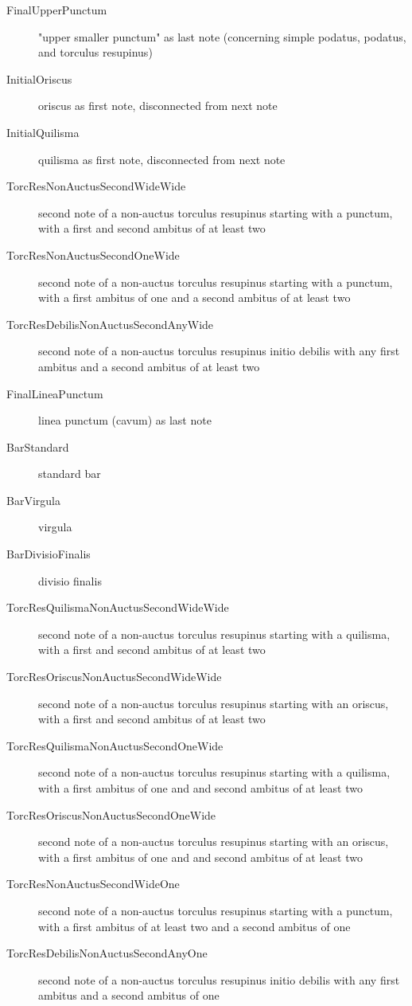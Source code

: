 \begin{shaded*}
\begin{description}
  \item[FinalUpperPunctum] "upper smaller punctum" as last note (concerning simple podatus, podatus, and torculus resupinus)
  \item[InitialOriscus] oriscus as first note, disconnected from next note
  \item[InitialQuilisma] quilisma as first note, disconnected from next note
  \item[TorcResNonAuctusSecondWideWide] second note of a non-auctus torculus resupinus starting with a punctum, with a first and second ambitus of at least two
  \item[TorcResNonAuctusSecondOneWide] second note of a non-auctus torculus resupinus starting with a punctum, with a first ambitus of one and a second ambitus of at least two
  \item[TorcResDebilisNonAuctusSecondAnyWide] second note of a non-auctus torculus resupinus initio debilis with any first ambitus and a second ambitus of at least two
  \item[FinalLineaPunctum] linea punctum (cavum) as last note
  \item[BarStandard] standard bar
  \item[BarVirgula] virgula
  \item[BarDivisioFinalis] divisio finalis
  \item[TorcResQuilismaNonAuctusSecondWideWide] second note of a non-auctus torculus resupinus starting with a quilisma, with a first and second ambitus of at least two
  \item[TorcResOriscusNonAuctusSecondWideWide] second note of a non-auctus torculus resupinus starting with an oriscus, with a first and second ambitus of at least two
  \item[TorcResQuilismaNonAuctusSecondOneWide] second note of a non-auctus torculus resupinus starting with a quilisma, with a first ambitus of one and and second ambitus of at least two
  \item[TorcResOriscusNonAuctusSecondOneWide] second note of a non-auctus torculus resupinus starting with an oriscus, with a first ambitus of one and and second ambitus of at least two
  \item[TorcResNonAuctusSecondWideOne] second note of a non-auctus torculus resupinus starting with a punctum, with a first ambitus of at least two and a second ambitus of one
  \item[TorcResDebilisNonAuctusSecondAnyOne] second note of a non-auctus torculus resupinus initio debilis with any first ambitus and a second ambitus of one

\end{description}
\end{shaded*}
